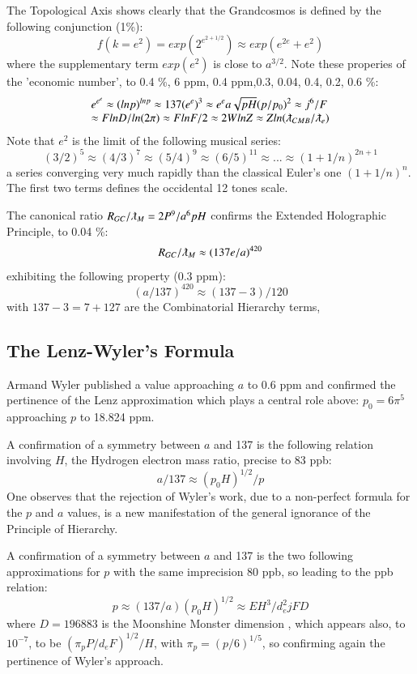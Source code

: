 \documentclass[twoside,draft]{article}
\begin{document}
\begin{sloppypar}
The Topological Axis shows clearly that the Grandcosmos is defined by the following conjunction (1\%):
\begin{equation}
f(k = e^{2}) = exp(2^{e^{2+1/2}}) \approx exp(e^{2e}+e^{2})
\end{equation}
where the supplementary term $exp(e^2)$ is close to $a^{3/2}$. Note these properies of the 'economic number', to 
0.4 \%, 6 ppm, 0.4 ppm,0.3, 0.04, 0.4, 0.2, 0.6 \%:
$$
\begin{array}{ll}
%
\displaystyle
e^{e^e}\approx (lnp)^{lnp}  
\approx 137 (e^{e})^3 \approx e^e a \sqrt{pH} (p/p_0)^2 \approx j^6/F \\
\approx FlnD/ln(2\pi) \approx FlnF/2 \approx 2WlnZ \approx Zln(\lambdabar_{CMB}/\lambdabar_e) 
\end{array}
$$
Note that $e^2$ is the limit of the following musical series:
$$(3/2)^5 \approx (4/3)^7   \approx (5/4)^9  \approx  (6/5)^{11}  \approx   ...  \approx  (1+1/n)^{2n+1}  $$  
a series converging very much rapidly than the classical Euler's one $(1+1/n)^n$. The first two terms defines the occidental 12 tones scale.

The canonical ratio $R_{GC}/\lambdabar_M = 2P^9/a^6pH $ confirms the Extended Holographic Principle, to 0.04 \%:
\begin{equation}
R_{GC}/\lambdabar_M  \approx (137e/a)^{420}  
\end{equation}
exhibiting the following property (0.3 ppm):
 $$ (a/137)^{420} \approx (137 - 3)/120 $$  
with $137 - 3 = 7 + 127$ are the Combinatorial Hierarchy terms, 

\subsection {The Lenz-Wyler's Formula}
Armand Wyler published a value approaching $a$ to 0.6 ppm and confirmed the pertinence
of the Lenz approximation which plays a central role above: $p_{0} = 6\pi^{5}$ approaching $p$ to 18.824 ppm.

A confirmation of a symmetry between $a$ and 137 is the following relation involving $H$, the
Hydrogen electron mass ratio, precise to 83 ppb:
$$a/137 \approx (p_0 H)^{1/2} /p$$
One observes that the rejection of Wyler's work, due to a non-perfect formula for the $p$ and $a$ values, is a new
manifestation of the general ignorance of the Principle of Hierarchy.

A confirmation of a symmetry between $a$ and 137 is the two following approximations for $p$ with the same imprecision 80 ppb, so leading to the ppb relation:
 $$p \approx (137/a) (p_0 H)^{1/2}  \approx EH^3/d_e^2jFD $$ 
where $D = 196883$ is the Moonshine Monster dimension \cite{Conway}, which appears also, to $10^{-7}$, to be $(\pi_p P/d_eF)^{1/2}/H$, with $\pi_p = (p/6)^{1/5}$, so confirming again the pertinence of Wyler's approach. 


\end{sloppypar}
\end{document}
